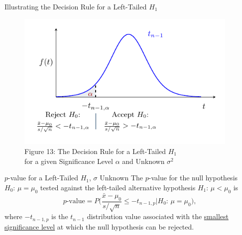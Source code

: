 \documentclass[pdf]{beamer}
\theoremstyle{remark}
\theoremstyle{definition}
\begin{document}
\begin{frame}[t]{Illustrating the Decision Rule for a Left-Tailed $H_1$ }
\begin{figure}[htbp]
    \centering
    \captionsetup{justification=centering}
    \includegraphics[clip, trim=0.5cm 0.5cm 0.0cm 0cm, width=0.95\textwidth]{Hypothesis_Testing_Module_9_t2.pdf}  
    \caption{Figure {\color{franklinblue} 13}: The Decision Rule for a Left-Tailed $H_1$ \\ for a given Significance Level $\alpha$ and Unknown $\sigma^2$}
    \label{fig:gauss5}
\end{figure}
\end{frame}

\begin{frame}[t]{$p$-value  for a Left-Tailed $H_1$, $\sigma$ Unknown}
The $p$-value for the null hypothesis $H_0\text{: }  \mu = \mu_0$ tested against the left-tailed alternative hypothesis $H_1\text{: }  \mu < \mu_0$ is \\
\vspace{1.5ex}
\begin{equation}
p\text{-value} = P\bigg( \frac{\bar{x} - \mu_0}{s/ \sqrt{n}} \leq -t_{n-1,p} | H_0\text{: }  \mu = \mu_0 \bigg),
\end{equation}
where $-t_{n-1,p}$ is the $t_{n-1}$ distribution value associated with the \underline{smallest significance level} at which the null hypothesis can be rejected. \\
\end{frame}
\end{document}
